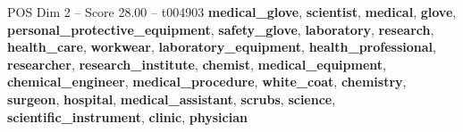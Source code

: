 \begin{textsample}{POS Dim 2 – Score 28.00 – t004903}  \label{ex:f2_pos_039}
\textbf{medical\_glove}, \textbf{scientist}, \textbf{medical}, \textbf{glove}, \textbf{personal\_protective\_equipment}, \textbf{safety\_glove}, \textbf{laboratory}, \textbf{research}, \textbf{health\_care}, \textbf{workwear}, \textbf{laboratory\_equipment}, \textbf{health\_professional}, \textbf{researcher}, \textbf{research\_institute}, \textbf{chemist}, \textbf{medical\_equipment}, \textbf{chemical\_engineer}, \textbf{medical\_procedure}, \textbf{white\_coat}, \textbf{chemistry}, \textbf{surgeon}, \textbf{hospital}, \textbf{medical\_assistant}, \textbf{scrubs}, \textbf{science}, \textbf{scientific\_instrument}, \textbf{clinic}, \textbf{physician}

\end{textsample}
